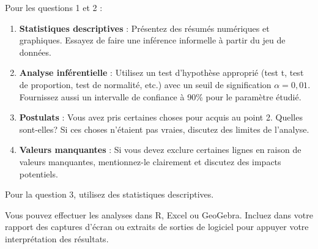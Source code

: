 \documentclass[11pt,french]{article}
\begin{document}
Pour les questions 1 et 2 :

\begin{enumerate}
  \item \textbf{Statistiques descriptives} : Présentez des résumés numériques et graphiques. Essayez de faire une inférence informelle à partir du jeu de données.

  \item \textbf{Analyse inférentielle} : Utilisez un test d’hypothèse approprié (test t, test de proportion, test de normalité, etc.) avec un seuil de signification $\alpha = 0{,}01$. Fournissez aussi un intervalle de confiance à 90\% pour le paramètre étudié.

  \item \textbf{Postulats} : Vous avez pris certaines choses pour acquis au point 2. Quelles sont-elles? Si ces choses n'étaient pas vraies, discutez des limites de l’analyse.

  \item \textbf{Valeurs manquantes} : Si vous devez exclure certaines lignes en raison de valeurs manquantes, mentionnez-le clairement et discutez des impacts potentiels.
\end{enumerate}

Pour la question 3, utilisez des statistiques descriptives.

Vous pouvez effectuer les analyses dans R, Excel ou GeoGebra.
Incluez dans votre rapport des captures d’écran ou extraits de sorties de logiciel pour appuyer votre interprétation des résultats.
\end{document}
